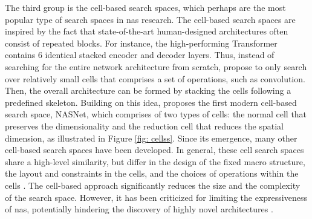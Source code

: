 \begin{description}[leftmargin=0cm, listparindent=\parindent]
		The third group is the cell-based search spaces, which perhaps are the most popular type of search spaces in \gls{nas} research. The cell-based search spaces are inspired by the fact that state-of-the-art human-designed architectures often consist of repeated blocks. For instance, the high-performing Transformer \cite{vaswani2017attention} contains 6 identical stacked encoder and decoder layers. Thus, instead of searching for the entire network architecture from scratch, \cite{zoph2018learning} propose to only search over relatively small cells  that comprises a set of operations, such as convolution. Then, the overall architecture can be formed by stacking the cells following a predefined skeleton. Building on this idea, \cite{zoph2018learning} proposes the first modern cell-based search space, NASNet, which comprises of two types of cells: the normal cell that preserves the dimensionality and the reduction cell that reduces the spatial dimension, as illustrated in Figure \ref{fig: cellss}. Since its emergence, many other cell-based search spaces have been developed. In general, these cell search spaces share a high-level similarity, but differ in the design of the fixed macro structure, the layout and constraints in the cells, and the choices of operations within the cells \cite{dong2020nasbench201, liu2018darts,  pmlr-v97-ying19a}. The cell-based approach significantly reduces the size and the complexity of the search space. However, it has been criticized for limiting the expressiveness of \gls{nas}, potentially hindering the discovery of highly novel architectures \cite{white2023survey}.	
		

\end{description}

